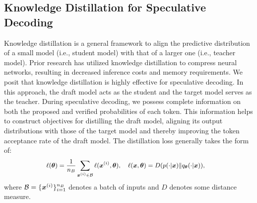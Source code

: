 \subsection{Knowledge Distillation for Speculative Decoding}
\label{sec:knowledge-distill}
Knowledge distillation is a general framework to align the predictive distribution of a small model (i.e., student model) 
with that of a larger one (i.e., teacher model).
Prior research has utilized knowledge distillation to compress neural networks, resulting in decreased inference costs and memory requirements. 
We posit that knowledge distillation is highly effective for speculative decoding. 
In this approach, the draft model acts as the student and the target model serves as the teacher. 
During speculative decoding, we possess complete information on both the proposed and verified probabilities of each token. 
This information helps to construct objectives for distilling the draft model, aligning its output distributions with those of the target model 
and thereby improving the token acceptance rate of the draft model.
The distillation loss generally takes the form of:
\begin{equation}
    \label{eq:distill}
    \small
    \begin{aligned}
        \ell(\vtheta) &= \frac{1}{n_B}\sum_{\vx^{(i)} \in \mathcal{B}} \ell(\vx^{(i)}, \vtheta), \quad \ell(\vx, \vtheta) =  D ({p(\cdot|\vx)} \Vert {q_\vtheta(\cdot|\vx)} ),%
    \end{aligned}
\end{equation}
where $\mathcal{B} = \{{\bm{x}}^{(i)}\}_{i=1}^{n_B}$ denotes a batch of inputs and $D$ denotes some distance measure. 

